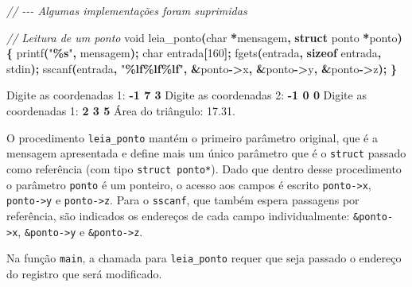 \documentclass[
  11pt,
  a4paper,
]{scrbook}
\newenvironment{Shaded}{\begin{snugshade}}{\end{snugshade}}
\newcommand{\CommentTok}[1]{\textcolor[rgb]{0.56,0.35,0.01}{\textit{#1}}}
\newcommand{\DataTypeTok}[1]{\textcolor[rgb]{0.13,0.29,0.53}{#1}}
\newcommand{\DecValTok}[1]{\textcolor[rgb]{0.00,0.00,0.81}{#1}}
\newcommand{\KeywordTok}[1]{\textcolor[rgb]{0.13,0.29,0.53}{\textbf{#1}}}
\newcommand{\NormalTok}[1]{#1}
\newcommand{\OperatorTok}[1]{\textcolor[rgb]{0.81,0.36,0.00}{\textbf{#1}}}
\newcommand{\SpecialCharTok}[1]{\textcolor[rgb]{0.81,0.36,0.00}{\textbf{#1}}}
\newcommand{\StringTok}[1]{\textcolor[rgb]{0.31,0.60,0.02}{#1}}
\begin{document}
\begin{Shaded}
\begin{Highlighting}[]
\CommentTok{// {-}{-}{-} Algumas implementações foram suprimidas}

\CommentTok{// Leitura de um ponto}
\DataTypeTok{void}\NormalTok{ leia\_ponto}\OperatorTok{(}\DataTypeTok{char} \OperatorTok{*}\NormalTok{mensagem}\OperatorTok{,} \KeywordTok{struct}\NormalTok{ ponto }\OperatorTok{*}\NormalTok{ponto}\OperatorTok{)} \OperatorTok{\{}
\NormalTok{    printf}\OperatorTok{(}\StringTok{"}\SpecialCharTok{\%s}\StringTok{"}\OperatorTok{,}\NormalTok{ mensagem}\OperatorTok{);}
    \DataTypeTok{char}\NormalTok{ entrada}\OperatorTok{[}\DecValTok{160}\OperatorTok{];}
\NormalTok{    fgets}\OperatorTok{(}\NormalTok{entrada}\OperatorTok{,} \KeywordTok{sizeof}\NormalTok{ entrada}\OperatorTok{,}\NormalTok{ stdin}\OperatorTok{);}
\NormalTok{    sscanf}\OperatorTok{(}\NormalTok{entrada}\OperatorTok{,} \StringTok{"}\SpecialCharTok{\%lf\%lf\%lf}\StringTok{"}\OperatorTok{,} \OperatorTok{\&}\NormalTok{ponto}\OperatorTok{{-}\textgreater{}}\NormalTok{x}\OperatorTok{,} \OperatorTok{\&}\NormalTok{ponto}\OperatorTok{{-}\textgreater{}}\NormalTok{y}\OperatorTok{,} \OperatorTok{\&}\NormalTok{ponto}\OperatorTok{{-}\textgreater{}}\NormalTok{z}\OperatorTok{);}
\OperatorTok{\}}
\end{Highlighting}
\end{Shaded}

\begin{Shaded}
\begin{Highlighting}[]
\NormalTok{Digite as coordenadas 1: }\KeywordTok{ {-}1 7 3 }
\NormalTok{Digite as coordenadas 2: }\KeywordTok{ {-}1 0 0 }
\NormalTok{Digite as coordenadas 1: }\KeywordTok{ 2 3 5 }
\NormalTok{Área do triângulo: 17.31.}
\end{Highlighting}
\end{Shaded}

O procedimento \texttt{leia\_ponto} mantém o primeiro parâmetro
original, que é a mensagem apresentada e define mais um único parâmetro
que é o \texttt{struct} passado como referência (com tipo
\texttt{struct\ ponto*}). Dado que dentro desse procedimento o parâmetro
\texttt{ponto} é um ponteiro, o acesso aos campos é escrito
\texttt{ponto-\textgreater{}x}, \texttt{ponto-\textgreater{}y} e
\texttt{ponto-\textgreater{}z}. Para o \texttt{sscanf}, que também
espera passagens por referência, são indicados os endereços de cada
campo individualmente: \texttt{\&ponto-\textgreater{}x},
\texttt{\&ponto-\textgreater{}y} e \texttt{\&ponto-\textgreater{}z}.

Na função \texttt{main}, a chamada para \texttt{leia\_ponto} requer que
seja passado o endereço do registro que será modificado.
\end{document}
